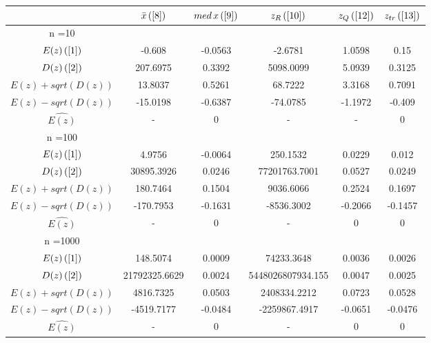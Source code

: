 \begin{tabular}{|c|c|c|c|c|c|}
\hline
 & $\bar{x} \, (\ref{8})$ & $med \, x \, (\ref{9})$ & $z_R \, (\ref{10})$ & $z_Q \, (\ref{12})$ & $z_{tr} \, (\ref{13})$ \\
\hline
n =10 &  &  &  &  & \\
\hline
$E(z) \, (\ref{1})$ & -0.608 & -0.0563 & -2.6781 & 1.0598 & 0.15\\
\hline
$D(z) \, (\ref{2})$ & 207.6975 & 0.3392 & 5098.0099 & 5.0939 & 0.3125\\
\hline
$E(z)+sqrt(D(z))$ & 13.8037 & 0.5261 & 68.7222 & 3.3168 & 0.7091\\
\hline
$E(z)-sqrt(D(z))$ & -15.0198 & -0.6387 & -74.0785 & -1.1972 & -0.409\\
\hline
$\hat{E(z)}$ & - & 0 & - & - & 0\\
\hline
n =100 &  &  &  &  & \\
\hline
$E(z) \, (\ref{1})$ & 4.9756 & -0.0064 & 250.1532 & 0.0229 & 0.012\\
\hline
$D(z) \, (\ref{2})$ & 30895.3926 & 0.0246 & 77201763.7001 & 0.0527 & 0.0249\\
\hline
$E(z)+sqrt(D(z))$ & 180.7464 & 0.1504 & 9036.6066 & 0.2524 & 0.1697\\
\hline
$E(z)-sqrt(D(z))$ & -170.7953 & -0.1631 & -8536.3002 & -0.2066 & -0.1457\\
\hline
$\hat{E(z)}$ & - & 0 & - & 0 & 0\\
\hline
n =1000 &  &  &  &  & \\
\hline
$E(z) \, (\ref{1})$ & 148.5074 & 0.0009 & 74233.3648 & 0.0036 & 0.0026\\
\hline
$D(z) \, (\ref{2})$ & 21792325.6629 & 0.0024 & 5448026807934.155 & 0.0047 & 0.0025\\
\hline
$E(z)+sqrt(D(z))$ & 4816.7325 & 0.0503 & 2408334.2212 & 0.0723 & 0.0528\\
\hline
$E(z)-sqrt(D(z))$ & -4519.7177 & -0.0484 & -2259867.4917 & -0.0651 & -0.0476\\
\hline
$\hat{E(z)}$ & - & 0 & - & 0 & 0\\
\hline
\end{tabular}
